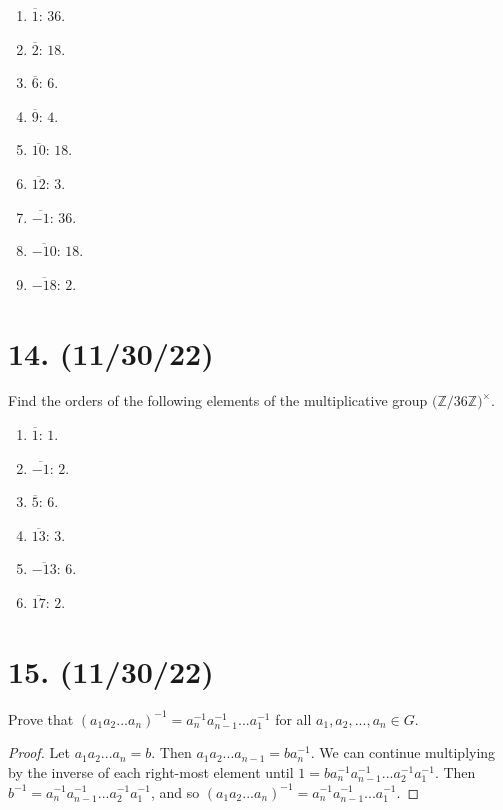 \documentclass{article}
\begin{document}
\begin{enumerate}[label=$\ast$]
      \item $\overline{1}$: $36$.
      \item $\overline{2}$: $18$.
      \item $\overline{6}$: $6$.
      \item $\overline{9}$: $4$.
      \item $\overline{10}$: $18$.
      \item $\overline{12}$: $3$.
      \item $\overline{-1}$: $36$.
      \item $\overline{-10}$: $18$.
      \item $\overline{-18}$: $2$.
\end{enumerate}

\section*{14. (11/30/22)}

Find the orders of the following elements of the multiplicative group $\bigl(\mathbb{Z}/36\mathbb{Z}\bigr)^\times$.

\begin{enumerate}[label=$\ast$]
      \item $\overline{1}$: $1$.
      \item $\overline{-1}$: $2$.
      \item $\overline{5}$: $6$.
      \item $\overline{13}$: $3$.
      \item $\overline{-13}$: $6$.
      \item $\overline{17}$: $2$.
\end{enumerate}

\section*{15. (11/30/22)}

Prove that $(a_1 a_2 ... a_n)^{-1} = a_n^{-1} a_{n-1}^{-1} ... a_1^{-1}$ for all $a_1, a_2, ... , a_n \in G$.

\begin{proof}
      Let $a_1 a_2 ... a_n = b$. Then $a_1 a_2 ... a_{n - 1} = b a_n^{-1}$. We can continue multiplying by the inverse of each right-most element until $1 = b a_n^{-1} a_{n - 1}^{-1} ... a_2^{-1} a_1^{-1}$. Then $b^{-1} = a_n^{-1} a_{n - 1}^{-1} ... a_2^{-1} a_1^{-1}$, and so $(a_1 a_2 ... a_n)^{-1} = a_n^{-1} a_{n-1}^{-1} ... a_1^{-1}$.
\end{proof}
\end{document}
